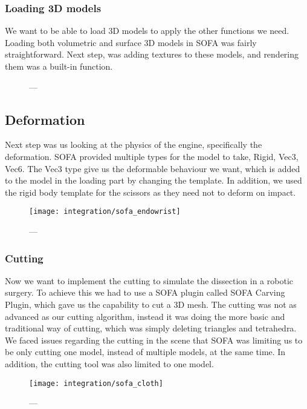\subsubsection{Loading 3D models}
We want to be able to load 3D models to apply the other functions we need. Loading both volumetric and surface 3D models in SOFA was fairly straightforward. Next step, was adding textures to these models, and rendering them was a built-in function.

\begin{figure}
  \centering%
  \setlength{\fboxsep}{0pt}%
  \setlength{\fboxrule}{0.1pt}%
  \caption{---}\label{fig:sofa_textures}
\end{figure}

\subsection{Deformation}
Next step was us looking at the physics of the engine, specifically the deformation. SOFA provided multiple types for the model to take, Rigid, Vec3, Vec6. The Vec3 type give us the deformable behaviour we want, which is added to the model in the loading part by changing the template. In addition, we used the rigid body template for the scissors as they need not to deform on impact.

\begin{figure}
  \centering%
  \texttt{[image: integration/sofa\_endowrist]}
  \caption{---}\label{fig:sofa_endowrist}
\end{figure}

\subsubsection{Cutting}
Now we want to implement the cutting to simulate the dissection in a robotic surgery. To achieve this we had to use a SOFA plugin called SOFA Carving Plugin, which gave us the capability to cut a 3D mesh. The cutting was not as advanced as our cutting algorithm, instead it was doing the more basic and traditional way of cutting, which was simply deleting triangles and tetrahedra. We faced issues regarding the cutting in the scene that SOFA was limiting us to be only cutting one model, instead of multiple models, at the same time. In addition, the cutting tool was also limited to one model.

\begin{figure}
  \centering%
  \texttt{[image: integration/sofa\_cloth]}
  \caption{---}\label{fig:sofa_cloth}
\end{figure}

